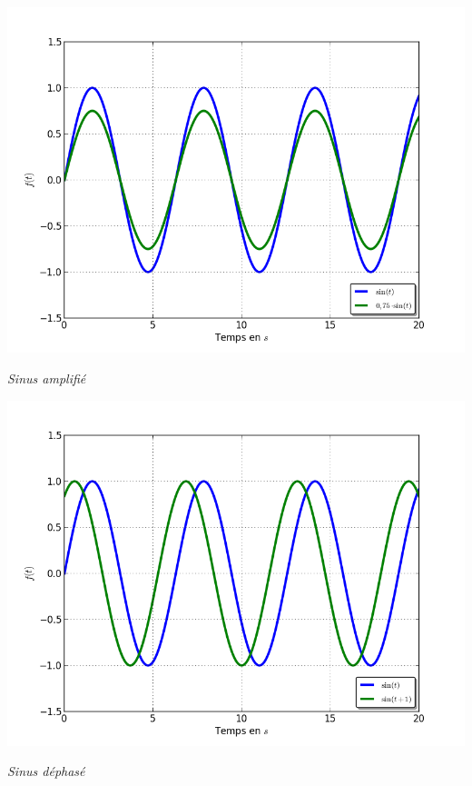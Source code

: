 \documentclass[10pt,oneside]{article}
\begin{document}
\begin{minipage}[c]{.3\linewidth}
\begin{center}
\includegraphics[width=.95\textwidth]{png/sinus_ampli}

\textit{Sinus amplifié}
\end{center}
\end{minipage}\hfill
\begin{minipage}[c]{.3\linewidth}
\begin{center}
\includegraphics[width=.95\textwidth]{png/sinus_dephase}

\textit{Sinus déphasé}
\end{center}
\end{minipage}\hfill
\end{document}
